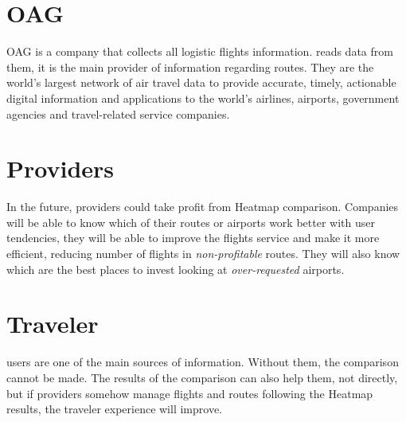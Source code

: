 \section{OAG}

OAG is a company that collects all logistic flights information. \squad reads data from them, it is the main provider of information regarding routes. They are the world's largest network of air travel data to provide accurate, timely, actionable digital information and applications to the world's airlines, airports, government agencies and travel-related service companies\cite{oag}.

\section{Providers}

In the future, providers could take profit from Heatmap comparison. Companies will be able to know which of their routes or airports work better with user tendencies, they will be able to improve the flights service and make it more efficient, reducing number of flights in \textit{non-profitable} routes. They will also know which are the best places to invest looking at \textit{over-requested} airports.

\section{Traveler}

\company users are one of the main sources of information. Without them, the comparison cannot be made. The results of the comparison can also help them, not directly, but if providers somehow manage flights and routes following the Heatmap results, the traveler experience will improve.


